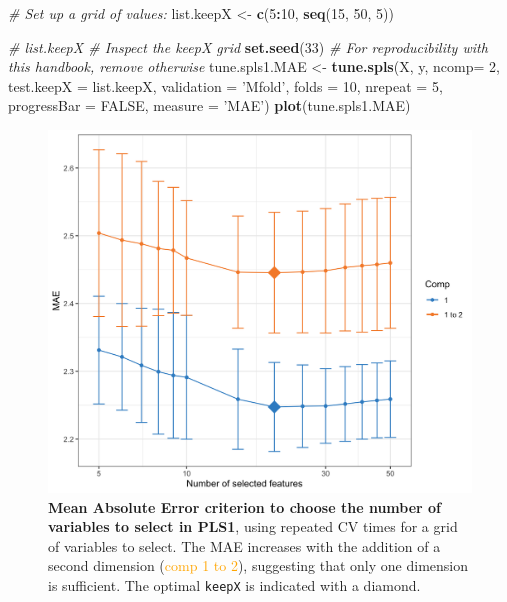 \documentclass[]{book}
\newenvironment{Shaded}{\begin{snugshade}}{\end{snugshade}}
\newcommand{\KeywordTok}[1]{\textcolor[rgb]{0.13,0.29,0.53}{\textbf{#1}}}
\newcommand{\DataTypeTok}[1]{\textcolor[rgb]{0.13,0.29,0.53}{#1}}
\newcommand{\DecValTok}[1]{\textcolor[rgb]{0.00,0.00,0.81}{#1}}
\newcommand{\StringTok}[1]{\textcolor[rgb]{0.31,0.60,0.02}{#1}}
\newcommand{\CommentTok}[1]{\textcolor[rgb]{0.56,0.35,0.01}{\textit{#1}}}
\newcommand{\OtherTok}[1]{\textcolor[rgb]{0.56,0.35,0.01}{#1}}
\newcommand{\OperatorTok}[1]{\textcolor[rgb]{0.81,0.36,0.00}{\textbf{#1}}}
\newcommand{\NormalTok}[1]{#1}
\begin{document}
\begin{Shaded}
\begin{Highlighting}[]
\CommentTok{# Set up a grid of values: }
\NormalTok{list.keepX <-}\StringTok{ }\KeywordTok{c}\NormalTok{(}\DecValTok{5}\OperatorTok{:}\DecValTok{10}\NormalTok{, }\KeywordTok{seq}\NormalTok{(}\DecValTok{15}\NormalTok{, }\DecValTok{50}\NormalTok{, }\DecValTok{5}\NormalTok{))     }

\CommentTok{# list.keepX  # Inspect the keepX grid}
\KeywordTok{set.seed}\NormalTok{(}\DecValTok{33}\NormalTok{)  }\CommentTok{# For reproducibility with this handbook, remove otherwise}
\NormalTok{tune.spls1.MAE <-}\StringTok{ }\KeywordTok{tune.spls}\NormalTok{(X, y, }\DataTypeTok{ncomp=} \DecValTok{2}\NormalTok{, }
                            \DataTypeTok{test.keepX =}\NormalTok{ list.keepX, }
                            \DataTypeTok{validation =} \StringTok{'Mfold'}\NormalTok{, }
                            \DataTypeTok{folds =} \DecValTok{10}\NormalTok{,}
                            \DataTypeTok{nrepeat =} \DecValTok{5}\NormalTok{, }
                            \DataTypeTok{progressBar =} \OtherTok{FALSE}\NormalTok{, }
                            \DataTypeTok{measure =} \StringTok{'MAE'}\NormalTok{)}
\KeywordTok{plot}\NormalTok{(tune.spls1.MAE)}
\end{Highlighting}
\end{Shaded}

\begin{figure}

{\centering \includegraphics[width=0.5\linewidth]{Figures/PLS/spls1-MAE-1} 

}

\caption{\textbf{Mean Absolute Error criterion to choose the
number of variables to select in PLS1}, using repeated CV times for a
grid of variables to select. The MAE increases with the addition of a
second dimension (\textcolor{orange}{comp 1 to 2}), suggesting that only
one dimension is sufficient. The optimal \texttt{keepX} is indicated
with a diamond.}\label{fig:spls1-MAE}
\end{figure}
\end{document}
